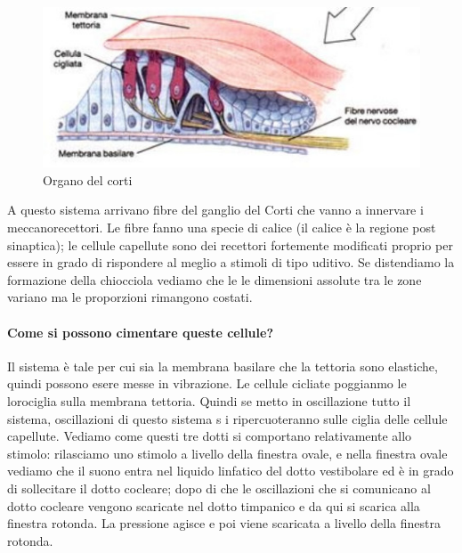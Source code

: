 \documentclass[a4paper,12pt]{article}
\begin{document}
\begin{figure}[H]
\centering
\includegraphics[scale=0.45]{immagine/corti1.jpg}
\caption{Organo del corti}
\end{figure}

A questo sistema arrivano fibre del ganglio del Corti che vanno a innervare i meccanorecettori. Le fibre fanno una specie di calice (il calice è la regione post sinaptica); le cellule capellute sono dei recettori fortemente modificati proprio per essere in grado di rispondere al meglio a stimoli di tipo uditivo. Se distendiamo la formazione della chiocciola vediamo che le le dimensioni assolute tra le zone variano ma le proporzioni rimangono costati. 

\paragraph{Come si possono cimentare queste cellule?}

Il sistema è tale per cui sia la membrana basilare che la tettoria sono elastiche, quindi possono esere messe in vibrazione. Le cellule cicliate poggianmo le lorociglia sulla membrana tettoria. Quindi se metto in oscillazione tutto il sistema, oscillazioni di questo sistema s i ripercuoteranno sulle ciglia delle cellule capellute. Vediamo come questi tre dotti si comportano relativamente allo stimolo: rilasciamo uno stimolo a livello della finestra ovale, e nella finestra ovale vediamo che il suono entra nel liquido linfatico del dotto vestibolare ed è in grado di sollecitare il dotto cocleare; dopo di che le oscillazioni che si comunicano al dotto cocleare vengono scaricate nel dotto timpanico e da qui si scarica alla finestra rotonda. La pressione agisce e poi viene scaricata a livello della finestra rotonda.
\end{document}
